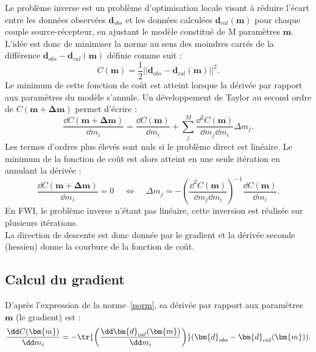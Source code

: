 Le problème inverse est un problème d'optimisation locale visant à réduire l'écart entre les données observées $\bm{d}_{obs}$ et les données calculées $\bm{d}_{cal}(\bm{m})$ pour chaque couple source-récepteur, en ajustant le modèle constitué de M paramètres $\bm{m}$. L'idée est donc de minimiser la norme au sens des moindres carrés de la différence $\bm{d}_{obs}-\bm{d}_{cal}(\bm{m})$ définie comme suit : 
\begin{equation}
	C(\bm{m})=\frac{1}{2}||\bm{d}_{obs}-\bm{d}_{cal}(\bm{m})||^{2}\text{.}
	\label{norm}
\end{equation}
 Le minimum de cette fonction de coût est atteint lorsque la dérivée par rapport aux paramètres du modèle s'annule. Un développement de Taylor au second ordre de $C(\bm{m}+ \bm{\Delta m})$ permet d'écrire : 
 \begin{equation}
 	\frac{\dd C(\bm{m}+\bm{\Delta m})}{\dd m_{i}}= \frac{\dd C(\bm{m})}{\dd m_{i}} + \displaystyle\sum_{j}^{M} \frac{\dd^{2} C(\bm{m})}{\dd m_{j} \dd m_{i}}\Delta m_{j}\text{.}
 \end{equation}
Les termes d'ordres plus élevés sont nuls si le problème direct est linéaire. Le minimum de la fonction de coût est alors atteint en une seule itération en annulant la dérivée : 
\begin{equation}
	\frac{\dd C(\bm{m}+\bm{\Delta m})}{\dd m_{i}} = 0 ~~~~~\Leftrightarrow ~~~~~ \Delta m _{j} = -\left( \frac{\dd ^{2} C(\bm{m})}{\dd m_{j} \dd m_{i} }\right)^{-1} \frac{\dd C (\bm{m})}{\dd m_{i}} \text{.}
\end{equation}
En FWI, le problème inverse n'étant pas linéaire, cette inversion est réalisée sur plusieurs itérations.\\
La direction de descente est donc donnée par le gradient et la dérivée seconde (hessien) donne la courbure de la fonction de coût.\\



\subsection{Calcul du gradient}

D'après l'expression de la norme~\ref{norm}, sa dérivée par rapport aux paramètres $\bm{m}$ (le gradient) est : 
\begin{equation}
	 \frac{\dd C (\bm{m})}{\dd m_{i}} = -\tr{\left( \frac{\dd \bm{d}_{cal}(\bm{m}) }{\dd m_{i}} \right)} ( \bm{d}_{obs} - \bm{d}_{cal}(\bm{m})) \text{.}
	 \label{eq_grad}
\end{equation}\\



